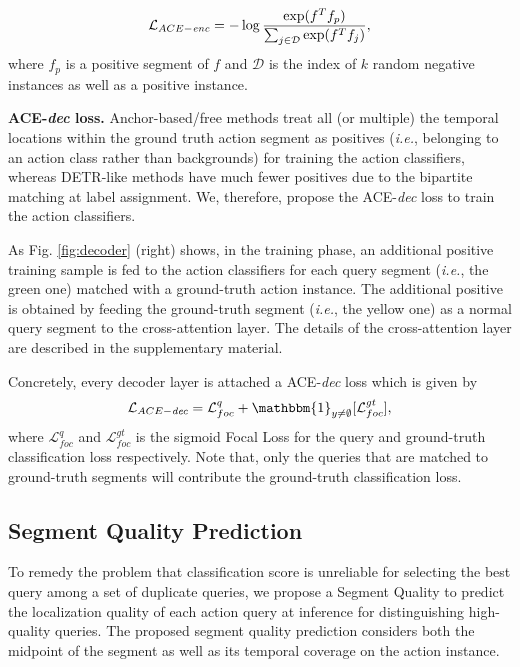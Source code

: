 \documentclass[runningheads]{llncs}
\def\ie{{\em i.e.}}
\newcommand{\figref}[1]{Fig. \ref{#1}}
\newcommand{\mc}[1]{\mathcal{#1}}
\def\score{Segment Quality }
\begin{document}
\begin{equation}
    \mc{L}_{ACE-\emph{enc}}=-\log{\frac{\exp(f^T f_p)}{\sum_{j\in\mc{D}}{\exp(f^T f_j)}}},
\end{equation}
where $f_p$ is a positive segment of $f$ and $\mc{D}$ is the index of $k$ random negative instances as well as a positive instance.



\textbf{ACE-\emph{dec} loss.} 
Anchor-based/free methods treat all (or multiple) the temporal locations within the ground truth action segment as positives (\ie, belonging to an action class rather than backgrounds) for training the action classifiers, whereas DETR-like methods have much fewer positives due to the bipartite matching at label assignment. We,  therefore, propose the ACE-\emph{dec} loss to train the action classifiers. 


As \figref{fig:decoder} (right) shows, in the training phase, an additional positive training sample is fed to the action classifiers for each query segment (\ie, the green one) matched with a ground-truth action instance. The additional positive is obtained by feeding the ground-truth segment (\ie, the yellow one) as a normal query segment to the cross-attention layer.
The details of the cross-attention layer are described in the supplementary material. 






Concretely, every decoder layer is attached a ACE-\emph{dec} loss which is given by  
\begin{equation}
    \mc{L}_{ACE-\emph{dec}}= \mc{L}_{foc}^q + \mathbbm{1}_{y\neq \emptyset}[\mc{L}_{foc}^{gt}],
\end{equation}
where $\mc{L}_{foc}^q$ and $\mc{L}_{foc}^{gt}$ is the sigmoid Focal Loss\cite{lin2017focal} for the query and ground-truth classification loss respectively. Note that, only the queries that are matched to ground-truth segments will contribute the ground-truth classification loss.




\subsection{Segment Quality Prediction}
To remedy the problem that classification score is unreliable for selecting the best query among a set of duplicate queries, we propose a \score to predict the localization quality of each action query at inference for distinguishing high-quality queries. 
The proposed segment quality prediction considers both the midpoint of the segment as well as its temporal coverage on the action instance.
\end{document}
